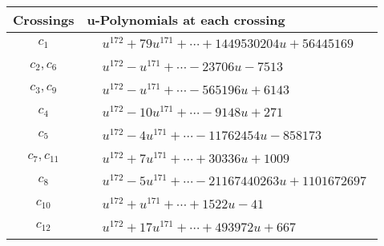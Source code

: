 \documentclass[1p]{elsarticle_modified}
\theoremstyle{definition}
\begin{document}
\begin{tabular}{m{50pt}|m{274pt}}
Crossings & \hspace{64pt}u-Polynomials at each crossing \\
\hline $$\begin{aligned}c_{1}\end{aligned}$$&$\begin{aligned}
&u^{172}+79 u^{171}+\cdots+1449530204 u+56445169
\end{aligned}$\\
\hline $$\begin{aligned}c_{2},c_{6}\end{aligned}$$&$\begin{aligned}
&u^{172}- u^{171}+\cdots-23706 u-7513
\end{aligned}$\\
\hline $$\begin{aligned}c_{3},c_{9}\end{aligned}$$&$\begin{aligned}
&u^{172}- u^{171}+\cdots-565196 u+6143
\end{aligned}$\\
\hline $$\begin{aligned}c_{4}\end{aligned}$$&$\begin{aligned}
&u^{172}-10 u^{171}+\cdots-9148 u+271
\end{aligned}$\\
\hline $$\begin{aligned}c_{5}\end{aligned}$$&$\begin{aligned}
&u^{172}-4 u^{171}+\cdots-11762454 u-858173
\end{aligned}$\\
\hline $$\begin{aligned}c_{7},c_{11}\end{aligned}$$&$\begin{aligned}
&u^{172}+7 u^{171}+\cdots+30336 u+1009
\end{aligned}$\\
\hline $$\begin{aligned}c_{8}\end{aligned}$$&$\begin{aligned}
&u^{172}-5 u^{171}+\cdots-21167440263 u+1101672697
\end{aligned}$\\
\hline $$\begin{aligned}c_{10}\end{aligned}$$&$\begin{aligned}
&u^{172}+u^{171}+\cdots+1522 u-41
\end{aligned}$\\
\hline $$\begin{aligned}c_{12}\end{aligned}$$&$\begin{aligned}
&u^{172}+17 u^{171}+\cdots+493972 u+667
\end{aligned}$\\
\hline
\end{tabular}\\~\\
\end{document}

